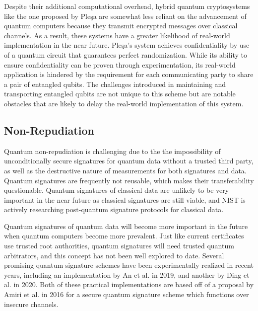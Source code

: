 \documentclass[sigconf]{acmart}
\begin{document}
Despite their additional computational overhead, hybrid quantum cryptosystems like the one proposed by Pleşa are somewhat less reliant on the advancement of quantum computers because they transmit encrypted messages over classical channels. As a result, these systems have a greater likelihood of real-world implementation in the near future. Pleşa's system achieves confidentiality by use of a quantum circuit that guarantees perfect randomization\cite{plesa_hybrid_2017}. While its ability to ensure confidentiality can be proven through experimentation, its real-world application is hindered by the requirement for each communicating party to share a pair of entangled qubits. The challenges introduced in maintaining and transporting entangled qubits are not unique to this scheme but are notable obstacles that are likely to delay the real-world implementation of this system.


\subsection{Non-Repudiation}
Quantum non-repudiation is challenging due to the the impossibility of unconditionally secure signatures for quantum data without a trusted third party, as well as the destructive nature of measurements for both signatures and data. Quantum signatures are frequently not reusable, which makes their transferability questionable. Quantum signatures of classical data are unlikely to be very important in the near future as classical signatures are still viable, and NIST is actively researching post-quantum signature protocols for classical data. 

Quantum signatures of quantum data will become more important in the future when quantum computers become more prevalent. Just like current certificates use trusted root authorities, quantum signatures will need trusted quantum arbitrators, and this concept has not been well explored to date. Several promising quantum signature schemes have been experimentally realized in recent years, including an implementation by An et al.\cite{an_practical_2019} in 2019, and another by Ding et al.\cite{ding_280-km_2020} in 2020. Both of these practical implementations are based off of a proposal by Amiri et al.\cite{amiri_secure_2016} in 2016 for a secure quantum signature scheme which functions over insecure channels. 
\end{document}
